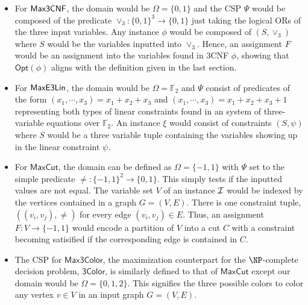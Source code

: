   \begin{example} \hfill{}
    \begin{itemize}
      \item For $\mathsf{Max3CNF}$, the domain would be $\Omega=\{0,1\}$ and the CSP $\Psi$ would be composed of the predicate $\vee_{3}:\{0,1\}^3 \rightarrow \{0,1\}$ just taking the logical ORs of the three input variables. Any instance $\phi$ would be composed of $(S,\vee_{3})$ where $S$ would be the variables inputted into $\vee_{3}$. Hence, an assignment $F$ would be an assignment into the variables found in 3CNF $\phi$, showing that $\mathsf{Opt}(\phi)$ aligns with the definition given in the last section. \newline

      \item For $\mathsf{MaxE3Lin}$, the domain would be $\Omega = \mathbb{F}_2$ and  $\Psi$ consist of predicates of the form $(x_1,\cdots,x_3) = x_1 + x_2 + x_3$ and $(x_1,\cdots,x_3) = x_1 + x_2 + x_3 + 1$ representing both types of linear constraints found in an system of three-variable equations over $\mathbb{F}_2$. An instance $\xi$ would consist of constraints $(S,\psi)$ where $S$ would be a three variable tuple containing the variables showing up in the linear constraint $\psi$. \newline

      \item For $\mathsf{MaxCut}$, the domain can be defined as $\Omega = \{-1,1\}$ with $\Psi$ set to the simple predicate $\neq:\{-1,1\}^2 \rightarrow \{0,1\}$. This simply tests if the inputted values are not equal. The variable set $V$ of an instance $\mathcal{I}$ would be indexed by the vertices contained in a graph $G=(V,E)$. There is one constraint tuple, $((v_i,v_j), \neq)$ for every edge $(v_i,v_j) \in E$. Thus, an assignment $F:V \rightarrow \{-1,1\}$ would encode a partition of $V$ into a cut $C$ with a constraint becoming satisified if the corresponding edge is contained in $C$. \newline

      \item The CSP for $\mathsf{Max3Color}$, the maximization counterpart for the $\NP$-complete decision problem, $\mathsf{3Color}$, is similarly defined to that of $\mathsf{MaxCut}$ except our domain would be $\Omega = \{0,1,2\}$. This signifies the three possible colors to color any vertex $v \in V$ in an input graph $G = (V,E)$.


    \end{itemize}
  \end{example}

